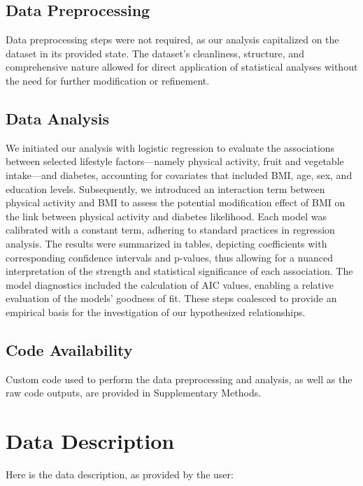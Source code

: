 \documentclass[11pt]{article}
\begin{document}
\subsection*{Data Preprocessing}
Data preprocessing steps were not required, as our analysis capitalized on the dataset in its provided state. The dataset's cleanliness, structure, and comprehensive nature allowed for direct application of statistical analyses without the need for further modification or refinement.

\subsection*{Data Analysis}
We initiated our analysis with logistic regression to evaluate the associations between selected lifestyle factors—namely physical activity, fruit and vegetable intake—and diabetes, accounting for covariates that included BMI, age, sex, and education levels. Subsequently, we introduced an interaction term between physical activity and BMI to assess the potential modification effect of BMI on the link between physical activity and diabetes likelihood. Each model was calibrated with a constant term, adhering to standard practices in regression analysis. The results were summarized in tables, depicting coefficients with corresponding confidence intervals and p-values, thus allowing for a nuanced interpretation of the strength and statistical significance of each association. The model diagnostics included the calculation of AIC values, enabling a relative evaluation of the models' goodness of fit. These steps coalesced to provide an empirical basis for the investigation of our hypothesized relationships.\subsection*{Code Availability}

Custom code used to perform the data preprocessing and analysis, as well as the raw code outputs, are provided in Supplementary Methods.






\clearpage
\appendix

\section{Data Description} \label{sec:data_description} Here is the data description, as provided by the user:
\end{document}
